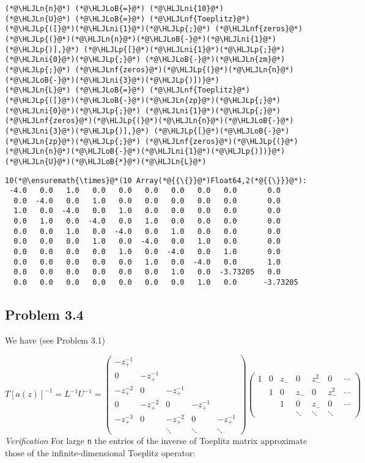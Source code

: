 \documentclass[12pt,a4paper]{article}
\newcommand{\HLJLn}[1]{#1}
\newcommand{\HLJLnf}[1]{\textcolor[RGB]{66,102,213}{#1}}
\newcommand{\HLJLni}[1]{\textcolor[RGB]{59,151,46}{#1}}
\newcommand{\HLJLoB}[1]{\textcolor[RGB]{102,102,102}{\textbf{#1}}}
\newcommand{\HLJLp}[1]{#1}
\def\sopmatrix#1{ \begin{pmatrix}#1\end{pmatrix} }
\begin{document}
\begin{lstlisting}
(*@\HLJLn{n}@*) (*@\HLJLoB{=}@*) (*@\HLJLni{10}@*)
(*@\HLJLn{U}@*) (*@\HLJLoB{=}@*) (*@\HLJLnf{Toeplitz}@*)(*@\HLJLp{([}@*)(*@\HLJLni{1}@*)(*@\HLJLp{;}@*) (*@\HLJLnf{zeros}@*)(*@\HLJLp{(}@*)(*@\HLJLn{n}@*)(*@\HLJLoB{-}@*)(*@\HLJLni{1}@*)(*@\HLJLp{)],}@*) (*@\HLJLp{[}@*)(*@\HLJLni{1}@*)(*@\HLJLp{;}@*) (*@\HLJLni{0}@*)(*@\HLJLp{;}@*) (*@\HLJLoB{-}@*)(*@\HLJLn{zm}@*)(*@\HLJLp{;}@*) (*@\HLJLnf{zeros}@*)(*@\HLJLp{(}@*)(*@\HLJLn{n}@*)(*@\HLJLoB{-}@*)(*@\HLJLni{3}@*)(*@\HLJLp{)])}@*)
(*@\HLJLn{L}@*) (*@\HLJLoB{=}@*) (*@\HLJLnf{Toeplitz}@*)(*@\HLJLp{([}@*)(*@\HLJLoB{-}@*)(*@\HLJLn{zp}@*)(*@\HLJLp{;}@*) (*@\HLJLni{0}@*)(*@\HLJLp{;}@*) (*@\HLJLni{1}@*)(*@\HLJLp{;}@*) (*@\HLJLnf{zeros}@*)(*@\HLJLp{(}@*)(*@\HLJLn{n}@*)(*@\HLJLoB{-}@*)(*@\HLJLni{3}@*)(*@\HLJLp{)],}@*) (*@\HLJLp{[}@*)(*@\HLJLoB{-}@*)(*@\HLJLn{zp}@*)(*@\HLJLp{;}@*) (*@\HLJLnf{zeros}@*)(*@\HLJLp{(}@*)(*@\HLJLn{n}@*)(*@\HLJLoB{-}@*)(*@\HLJLni{1}@*)(*@\HLJLp{)])}@*)
(*@\HLJLn{U}@*)(*@\HLJLoB{*}@*)(*@\HLJLn{L}@*)
\end{lstlisting}

\begin{lstlisting}
10(*@\ensuremath{\times}@*(10 Array(*@{{\{}}@*)Float64,2(*@{{\}}}@*):
 -4.0   0.0   1.0   0.0   0.0   0.0   0.0   0.0   0.0       0.0
  0.0  -4.0   0.0   1.0   0.0   0.0   0.0   0.0   0.0       0.0
  1.0   0.0  -4.0   0.0   1.0   0.0   0.0   0.0   0.0       0.0
  0.0   1.0   0.0  -4.0   0.0   1.0   0.0   0.0   0.0       0.0
  0.0   0.0   1.0   0.0  -4.0   0.0   1.0   0.0   0.0       0.0
  0.0   0.0   0.0   1.0   0.0  -4.0   0.0   1.0   0.0       0.0
  0.0   0.0   0.0   0.0   1.0   0.0  -4.0   0.0   1.0       0.0
  0.0   0.0   0.0   0.0   0.0   1.0   0.0  -4.0   0.0       1.0
  0.0   0.0   0.0   0.0   0.0   0.0   1.0   0.0  -3.73205   0.0
  0.0   0.0   0.0   0.0   0.0   0.0   0.0   1.0   0.0      -3.73205
\end{lstlisting}


\subsection{Problem 3.4}
We have (see Problem 3.1)

\[
T[a(z)]^{-1} = L^{-1} U^{-1} =
\sopmatrix{-z_+^{-1} \\
0 & -z_+^{-1} \\
-z_+^{-2} & 0 & -z_+^{-1} \\
0 & -z_+^{-2} & 0 & -z_+^{-1} \\
-z_+^{-3} & 0 & -z_+^{-2} & 0 & -z_+^{-1} \\
&&\ddots & \ddots & \ddots
}
\sopmatrix{
1 & 0 & z_- & 0 &z_-^2 & 0 & \cdots \\
& 1 & 0 & z_- & 0 &z_-^2 & \cdots \\
& & 1 & 0 & z_- & 0 & \cdots \\
&&&\ddots & \ddots & \ddots
}
\]
\emph{Verification} For large \texttt{n} the entries of the inverse of Toeplitz matrix approximate those of the infinite-dimensional Toeplitz operator:
\end{document}

